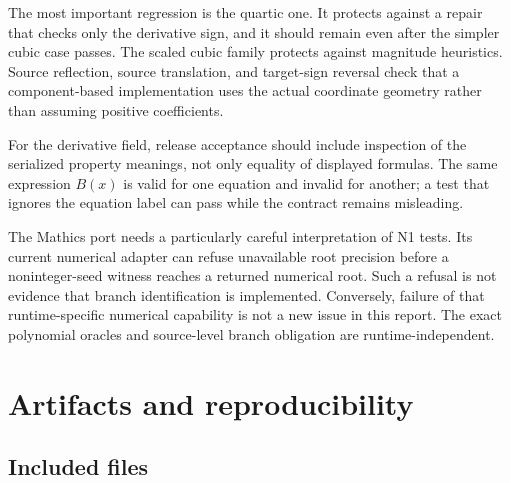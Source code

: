 \documentclass[11pt,letterpaper]{article}
\begin{document}
The most important regression is the quartic one. It protects against a repair that checks only the derivative sign, and it should remain even after the simpler cubic case passes. The scaled cubic family protects against magnitude heuristics. Source reflection, source translation, and target-sign reversal check that a component-based implementation uses the actual coordinate geometry rather than assuming positive coefficients.

For the derivative field, release acceptance should include inspection of the serialized property meanings, not only equality of displayed formulas. The same expression $B(x)$ is valid for one equation and invalid for another; a test that ignores the equation label can pass while the contract remains misleading.

The Mathics port needs a particularly careful interpretation of N1 tests. Its current numerical adapter can refuse unavailable root precision before a noninteger-seed witness reaches a returned numerical root. Such a refusal is not evidence that branch identification is implemented. Conversely, failure of that runtime-specific numerical capability is not a new issue in this report. The exact polynomial oracles and source-level branch obligation are runtime-independent.\cite{mathicsnumerical,mathics}

\section{Artifacts and reproducibility}
\label{sec:artifacts}

\subsection{Included files}
\end{document}
